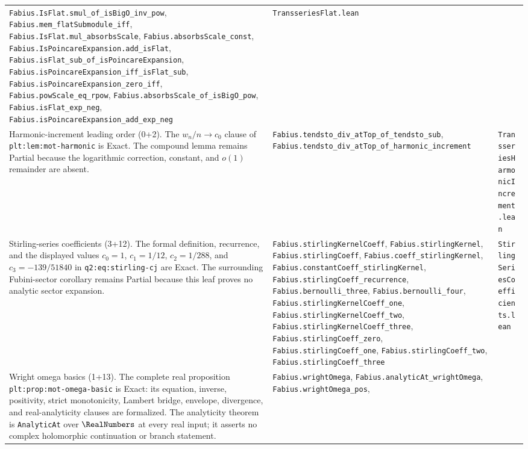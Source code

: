\documentclass[11pt,oneside]{article}
\theoremstyle{definition}
\theoremstyle{remark}
\begin{document}
\begin{longtable}{@{}p{}p{}p{}@{}}
\nolinkurl{Fabius.IsFlat.smul_of_isBigO_inv_pow},
\nolinkurl{Fabius.mem_flatSubmodule_iff},
\nolinkurl{Fabius.IsFlat.mul_absorbsScale},
\nolinkurl{Fabius.absorbsScale_const},
\nolinkurl{Fabius.IsPoincareExpansion.add_isFlat},
\nolinkurl{Fabius.isFlat_sub_of_isPoincareExpansion},
\nolinkurl{Fabius.isPoincareExpansion_iff_isFlat_sub},
\nolinkurl{Fabius.isPoincareExpansion_zero_iff},
\nolinkurl{Fabius.powScale_eq_rpow},
\nolinkurl{Fabius.absorbsScale_of_isBigO_pow},
\nolinkurl{Fabius.isFlat_exp_neg},
\nolinkurl{Fabius.isPoincareExpansion_add_exp_neg} &
\nolinkurl{TransseriesFlat.lean} \\
Harmonic-increment leading order (0+2).  The \(w_n/n\to c_0\) clause of
\nolinkurl{plt:lem:mot-harmonic} is Exact.  The compound lemma remains Partial
because the logarithmic correction, constant, and \(o(1)\) remainder are
absent. &
\nolinkurl{Fabius.tendsto_div_atTop_of_tendsto_sub},
\nolinkurl{Fabius.tendsto_div_atTop_of_harmonic_increment} &
\nolinkurl{TransseriesHarmonicIncrement.lean} \\
Stirling-series coefficients (3+12).  The formal definition, recurrence, and
the displayed values \(c_0=1\), \(c_1=1/12\), \(c_2=1/288\), and
\(c_3=-139/51840\) in \nolinkurl{q2:eq:stirling-cj} are Exact.  The
surrounding Fubini-sector corollary remains Partial because this leaf proves no
analytic sector expansion. &
\nolinkurl{Fabius.stirlingKernelCoeff},
\nolinkurl{Fabius.stirlingKernel},
\nolinkurl{Fabius.stirlingCoeff},
\nolinkurl{Fabius.coeff_stirlingKernel},
\nolinkurl{Fabius.constantCoeff_stirlingKernel},
\nolinkurl{Fabius.stirlingCoeff_recurrence},
\nolinkurl{Fabius.bernoulli_three},
\nolinkurl{Fabius.bernoulli_four},
\nolinkurl{Fabius.stirlingKernelCoeff_one},
\nolinkurl{Fabius.stirlingKernelCoeff_two},
\nolinkurl{Fabius.stirlingKernelCoeff_three},
\nolinkurl{Fabius.stirlingCoeff_zero},
\nolinkurl{Fabius.stirlingCoeff_one},
\nolinkurl{Fabius.stirlingCoeff_two},
\nolinkurl{Fabius.stirlingCoeff_three} &
\nolinkurl{StirlingSeriesCoefficients.lean} \\
Wright omega basics (1+13).  The complete real proposition
\nolinkurl{plt:prop:mot-omega-basic} is Exact: its equation, inverse,
positivity, strict monotonicity, Lambert bridge, envelope, divergence, and
real-analyticity clauses are formalized.  The analyticity theorem is
\nolinkurl{AnalyticAt} over \(\RealNumbers\) at every real input; it asserts no
complex holomorphic continuation or branch statement. &
\nolinkurl{Fabius.wrightOmega},
\nolinkurl{Fabius.analyticAt_wrightOmega},
\nolinkurl{Fabius.wrightOmega_pos},

\end{longtable}
\end{document}
